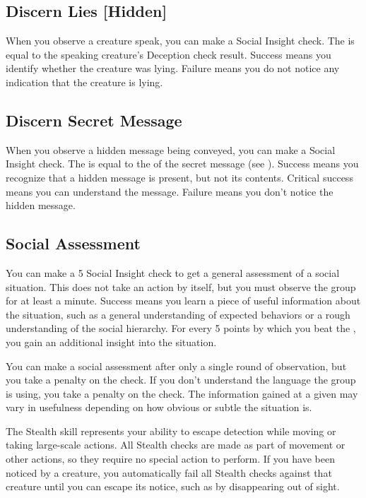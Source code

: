     \subsection{Discern Lies [Hidden]}
        When you observe a creature speak, you can make a Social Insight check.
        The  is equal to the speaking creature's Deception check result.
        Success means you identify whether the creature was lying.
        Failure means you do not notice any indication that the creature is lying.

    \subsection{Discern Secret Message}
        When you observe a hidden message being conveyed, you can make a Social Insight check.
        The  is equal to the  of the secret message (see ).
        Success means you recognize that a hidden message is present, but not its contents.
        Critical success means you can understand the message.
        Failure means you don't notice the hidden message.

    \subsection{Social Assessment}\label{Social Assessment}
        You can make a  5 Social Insight check to get a general assessment of a social situation.
        This does not take an action by itself, but you must observe the group for at least a minute.
        Success means you learn a piece of useful information about the situation, such as a general understanding of expected behaviors or a rough understanding of the social hierarchy.
        For every 5 points by which you beat the , you gain an additional insight into the situation.

        You can make a social assessment after only a single round of observation, but you take a  penalty on the check.
        If you don't understand the language the group is using, you take a  penalty on the check.
        The information gained at a given  may vary in usefulness depending on how obvious or subtle the situation is.

\newpage
{}
        The Stealth skill represents your ability to escape detection while moving or taking large-scale actions.
        All Stealth checks are made as part of movement or other actions, so they require no special action to perform. If you have been noticed by a creature, you automatically fail all Stealth checks against that creature until you can escape its notice, such as by disappearing out of sight.

